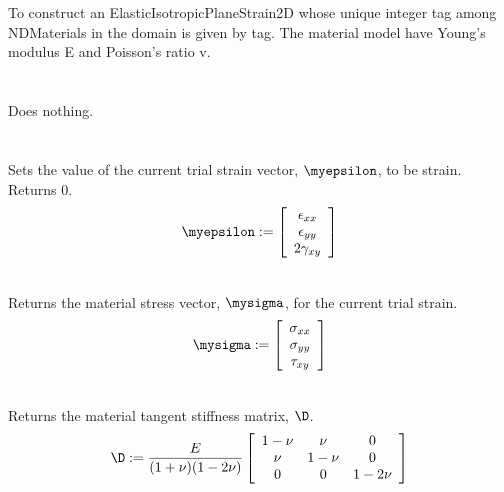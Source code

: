   \\
  \\
To construct an ElasticIsotropicPlaneStrain2D whose unique integer tag
among NDMaterials in the domain is given by \p tag.  The material
model have Young's modulus \p E and Poisson's ratio \p v. \\

 \\
 \\
Does nothing. \\ 

 \\
  \\
Sets the value of the current trial strain vector, $\myepsilon$,
to be \p strain. Returns $0$. \\

\begin{displaymath}
\myepsilon := \left[
   \begin{array}{c}
       \epsilon_{xx} \\
       \epsilon_{yy}   \\
       2 \gamma_{xy}   
   \end{array} 
 \right]
\end{displaymath}

 \\
Returns the material stress vector, $\mysigma$, for the current
trial strain. \\

\begin{displaymath}
\mysigma := \left[
   \begin{array}{c}
       \sigma_{xx} \\
       \sigma_{yy}   \\
       \tau_{xy}   
   \end{array} 
 \right]
\end{displaymath}

 \\
Returns the material tangent stiffness matrix, $\D$. \\

\begin{displaymath}
\D := \frac{E}{(1+\nu)(1-2\nu)} \left[
   \begin{array}{ccc}
         1-\nu &     \nu &      0 \\
           \nu &   1-\nu &      0 \\
             0 &       0 & 1-2\nu
   \end{array} 
 \right]
\end{displaymath}

